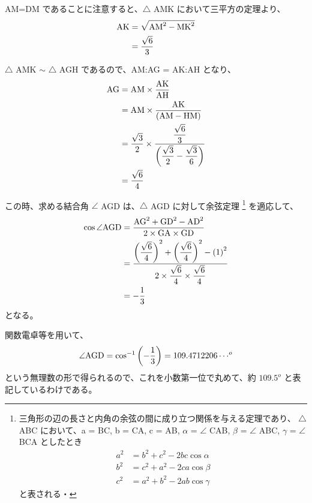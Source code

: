 \documentclass[a4paper,11pt]{ltjsarticle}
\begin{document}
\begin{appendix}
AM=DM であることに注意すると、$\bigtriangleup$ AMK において三平方の定理より、
\begin{align*}
{\rm AK} 
	&= \sqrt{ {\rm AM}^2 - {\rm MK}^2 } \\
	&= \dfrac{\sqrt{6}}{3}
\end{align*}

$\bigtriangleup$ AMK $\sim$ $\bigtriangleup$ AGH であるので、AM:AG = AK:AH となり、
\begin{align*}
{\rm AG} 
	&= { {\rm AM} } \times \dfrac{ {\rm AK} }{ {\rm AH} } \\
	&= { {\rm AM} } \times \dfrac{ {\rm AK} }{ ({\rm AM} - {\rm HM}) } \\
	&= \dfrac{\sqrt{3}}{2} \times \dfrac{ \dfrac{\sqrt{6}}{3} }{ \left( \dfrac{\sqrt{3}}{2} - \dfrac{\sqrt{3}}{6} \right) } \\
	&= \dfrac{ \sqrt{6} }{ 4 }
\end{align*}

この時、求める結合角 $\angle$ AGD は、$\bigtriangleup$ AGD に対して余弦定理
\footnote
{
三角形の辺の長さと内角の余弦の間に成り立つ関係を与える定理であり、
$\bigtriangleup$ ABC において、a = BC, b = CA, c = AB, $\alpha$ = $\angle$ CAB, $\beta$ = $\angle$ ABC, $\gamma$ = $\angle$ BCA としたとき
\begin{align*}
a^2 &= b^2 + c^2 − 2 bc \cos \alpha \\
b^2 &= c^2 + a^2 − 2 ca \cos \beta \\
c^2 &= a^2 + b^2 − 2 ab \cos \gamma
\end{align*}
と表される・
}
を適応して、
\begin{align*}
\cos \angle {\rm AGD} 
	&= \dfrac{ {\rm AG}^2 + {\rm GD}^2 - {\rm AD}^2 }{ 2 \times {\rm GA} \times {\rm GD} } \\
	&= \dfrac{ \left( \dfrac{ \sqrt{6} }{ 4 } \right)^2 + \left( \dfrac{ \sqrt{6} }{ 4 } \right)^2 - \left( 1 \right)^2 }{ 2 \times \dfrac{ \sqrt{6} }{ 4 } \times \dfrac{ \sqrt{6} }{ 4 } } \\
	&= -\dfrac{ 1 }{ 3 }
\end{align*}
となる。

関数電卓等を用いて、
\begin{align*}
\angle {\rm AGD} = \cos ^{-1} \left( -\dfrac{1}{3} \right) = 109.4712206 \cdots^o
\end{align*}
という無理数の形で得られるので、これを小数第一位で丸めて、約 $109.5^o$ と表記しているわけである。


\end{appendix}
\end{document}
